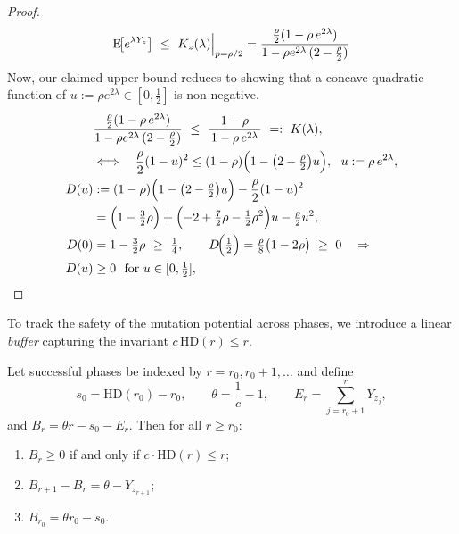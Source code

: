 \begin{proof}
	\begin{align*}
		\EE\!\big[e^{\lambda Y_z}\big]
		\ \le\ K_z(\lambda)\Big|_{p=\rho/2}=\frac{\tfrac{\rho}{2}(1-\rho\,e^{2\lambda})}{1-\rho e^{2\lambda}\,(2-\tfrac{\rho}{2})}
	\end{align*}
	Now, our claimed upper bound reduces to showing that a concave quadratic function of $u:=\rho e^{2\lambda} \in \left[0,\frac{1}{2}\right]$ is non-negative.
	\begin{align*}
		&\frac{\tfrac{\rho}{2}(1-\rho\,e^{2\lambda})}{1-\rho e^{2\lambda}\,(2-\tfrac{\rho}{2})}
		\  \le\ \frac{1-\rho}{\,1-\rho\,e^{2\lambda}\,}
		\ =:\ K(\lambda),
		\\&\Longleftrightarrow\quad
		\frac{\rho}{2}(1-u)^2 \le (1-\rho)\Bigl(1-\bigl(2-\tfrac{\rho}{2}\bigr)u\Bigr),\ \ u:=\rho\,e^{2\lambda},
		\\
		D(u)
		&:=(1-\rho)\Bigl(1-\bigl(2-\tfrac{\rho}{2}\bigr)u\Bigr)-\frac{\rho}{2}(1-u)^2
		\\&= \Bigl(1-\tfrac{3}{2}\rho\Bigr)+\Bigl(-2+\tfrac{7}{2}\rho-\tfrac{1}{2}\rho^2\Bigr)u-\tfrac{\rho}{2}u^2,
		\\
		D(0)&=1-\tfrac{3}{2}\rho\ \ge\ \tfrac14,\qquad
		D\!\Big(\tfrac12\Big)=\tfrac{\rho}{8}\bigl(1-2\rho\bigr)\ \ge\ 0
		\quad\Rightarrow\quad \\
		D(u)&\ge 0\ \text{ for }u\in[0,\tfrac12],
	\end{align*}
	
	
\end{proof}


To track the safety of the mutation potential across phases, we introduce a 
linear \emph{buffer}  capturing the invariant $c\,\mathrm{HD}(r)\le r$.

\begin{lemma}%
	\label{lem:buffer}
	Let successful phases be indexed by $r=r_0,r_0+1,\dots$ and define
	\[
	s_0=\mathrm{HD}(r_0)-r_0, \qquad 
	\theta=\frac{1}{c}-1, \qquad
	E_r=\sum_{j=r_0+1}^{r} Y_{z_j},
	\]
	and $B_r = \theta r - s_0 - E_r$.
	Then for all $r\ge r_0$:
	\begin{enumerate}
		\item 
		$B_r\ge0$ if and only if $c\cdot\mathrm{HD}(r)\le r$;
		\item 
		$B_{r+1}-B_r=\theta-Y_{z_{r+1}}$;
		\item 
		$B_{r_0}=\theta r_0 - s_0$.
	\end{enumerate}
\end{lemma}

